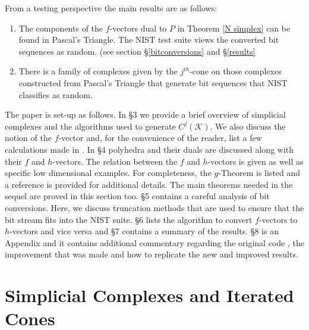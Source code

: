 \documentclass[oneside,12pt]{amsart}
\theoremstyle{definition}
\numberwithin{equation}{section}
\begin{document}
From a testing perspective the main results are as follows: %

\begin{enumerate}
  \item The components of the $f$-vectors dual to $P$ in Theorem \ref{N simplex} can be found in Pascal's Triangle.  The NIST test suite views the converted bit sequences as random. (see section \S\ref{bitconversions} and \S\ref{results}\\[.5ex] %

  \item There is a family of complexes given by the $j^{th}$-cone on those complexes constructed from Pascal's Triangle that generate bit sequences that NIST classifies as random. %

\end{enumerate}

The paper is set-up as follows.  In \S 3 we provide a brief overview of simplicial complexes and the algorithms used to generate $C^j(\mathcal{K})$.  We also discuss the notion of the $f$-vector and, for the convenience of the reader, list a few calculations made in \cite{ALDH}.  In \S 4 polyhedra and their duals are discussed along with their $f$ and $h$-vectors.  The relation between the $f$ and $h$-vectors is given as well as specific low dimensional examples.  For completeness, the $g$-Theorem is listed and a reference is provided for additional details.  The main theorems needed in the sequel are proved in this section too.  \S 5 contains a careful analysis of bit conversions.  Here, we discuss truncation methods that are used to ensure that the bit stream fits into the NIST suite.  \S 6 lists the algorithm to convert $f$-vectors to $h$-vectors and vice versa and \S 7 contains a summary of the results. \S8 is an Appendix and it contains additional commentary regarding the original code \cite{ALDH}, the improvement that was made and how to replicate the new and improved results.

\section{Simplicial Complexes and Iterated Cones}
\end{document}
